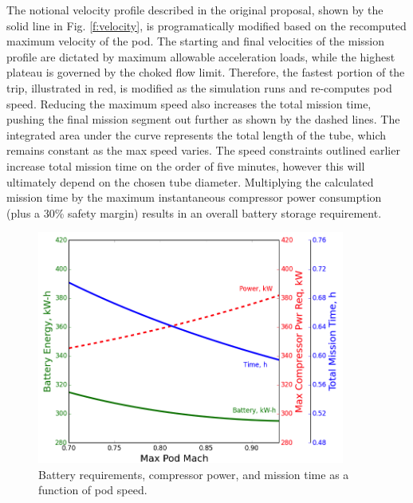 \documentclass[heading.tex]{subfiles}
\begin{document}
The notional velocity profile described in the original proposal, shown by the solid line in Fig. \ref{f:velocity},
is programatically modified based on the recomputed maximum velocity of the pod. The starting and final velocities of the
mission profile are dictated by maximum allowable acceleration loads, while the highest plateau is governed by the
choked flow limit. Therefore, the fastest portion of the trip, illustrated in red, is modified as the simulation runs and re-computes pod speed.
Reducing the maximum speed also increases the total mission time,
pushing the final mission segment out further as shown by the dashed lines.
The integrated area under the curve represents the total length of the tube, which remains constant as the max speed varies.
The speed constraints outlined earlier increase total mission time on the order of five minutes,
however this will ultimately depend on the chosen tube diameter.
Multiplying the calculated mission time by the maximum instantaneous compressor power consumption (plus a 30\% safety margin)
results in an overall battery storage requirement.

\begin{figure}[hbtp]
\centering
\includegraphics[width=0.9\textwidth]{images/battery_plot2.png}
\caption[Battery/Compressor/Mission requirements as a function of pod speed]
{Battery requirements, compressor power, and mission time as a function of pod speed.}
\label{f:battery}
\end{figure}
\end{document}
